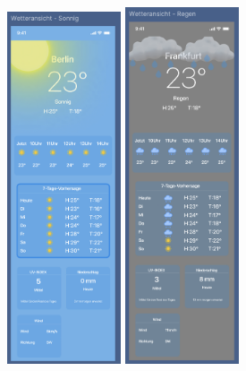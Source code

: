 \documentclass{article}
\begin{document}
\begin{figure}[H]
\centering
\includegraphics[width=0.3\textwidth]{wetter_sonnig.png}\hfill
\includegraphics[width=0.3\textwidth]{wetter_regen.png}\hfill

\end{figure}
\end{document}
